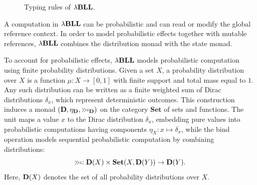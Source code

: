 \begin{figure}[ht]
\begin{center}
\end{center}
\vspace*{-6mm}
\caption{Typing rules of ${\lambda}\mathbf{BLL}$.}
\label{fig:typingRules}
\end{figure}

A computation in ${\lambda}\mathbf{BLL}$ can be probabilistic and can read or modify the global reference context. In order to model probabilistic effects together with mutable references, ${\lambda}\mathbf{BLL}$ combines the distribution monad with the state monad.

To account for probabilistic effects, ${\lambda}\mathbf{BLL}$ models probabilistic computation using finite probability distributions. Given a set $X$, a probability distribution over $X$ is a function $\mu : X \to [0,1]$ with finite support and total mass equal to $1$. Any such distribution can be written as a finite weighted sum of Dirac distributions $\delta_x$, which represent deterministic outcomes. This construction induces a monad $(\D, \eta_{\D}, \bind_{\D})$ on the category $\mathbf{Set}$ of sets and functions. The unit maps a value $x$ to the Dirac distribution $\delta_x$, embedding pure values into probabilistic computations having components $\eta_X : x \mapsto \delta_x$, while the bind operation models sequential probabilistic computation by combining distributions:
\[
\bind : \D(X) \times \mathbf{Set}(X,\D(Y)) \to \D(Y).
\]
Here, $\mathbf{D}(X)$ denotes the set of all probability distributions over $X$.

